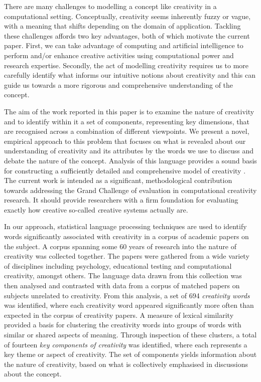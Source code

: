 \documentclass[10pt,letterpaper]{article}
\begin{document}
There are many challenges to modelling a concept like creativity in a computational setting. Conceptually, creativity seems inherently fuzzy or vague, with a meaning that shifts depending on the domain of application. Tackling these challenges affords two key advantages, both of which motivate the current paper. First, we can take advantage of computing and artificial intelligence to perform and/or enhance creative activities using computational power and research expertise. Secondly, the act of modelling creativity requires us to more carefully identify what informs our intuitive notions about creativity and this can guide us towards a more rigorous and comprehensive understanding of the concept.  

The aim of the work reported in this paper is to examine the nature of creativity and to identify within it a set of components, representing key dimensions, that are recognised across a combination of different viewpoints. We present a novel, empirical approach to this problem that focuses on what is revealed about our understanding of creativity and its attributes by the words we use to discuss and debate the nature of the concept. Analysis of this language provides a sound basis for constructing a sufficiently detailed and comprehensive model of creativity \cite{lakoff87,wittgenstein58}. The current work is intended as a significant, methodological contribution towards addressing the Grand Challenge of evaluation in computational creativity research. It should provide researchers with a firm foundation for evaluating exactly how creative so-called {\emph creative systems} actually are.

In our approach, statistical language processing techniques are used to identify words significantly associated with creativity in a corpus of academic papers on the subject. A corpus spanning some 60 years of research into the nature of creativity was collected together. The papers were gathered from a wide variety of disciplines including psychology, educational testing and computational creativity, amongst others. The language data drawn from this collection was then analysed and contrasted with data from a corpus of matched papers on subjects unrelated to creativity. From this analysis, a set of 694 {\em creativity words\/} was identified, where each creativity word appeared significantly more often than expected in the corpus of creativity papers. A measure of lexical similarity provided a basis for clustering the creativity words into groups of words with similar or shared aspects of meaning. Through inspection of these clusters, a total of fourteen {\em key components of creativity\/} was identified, where each represents a key theme or aspect of creativity. The set of components yields information about the nature of creativity, based on what is collectively emphasised in discussions about the concept. 
\end{document}

